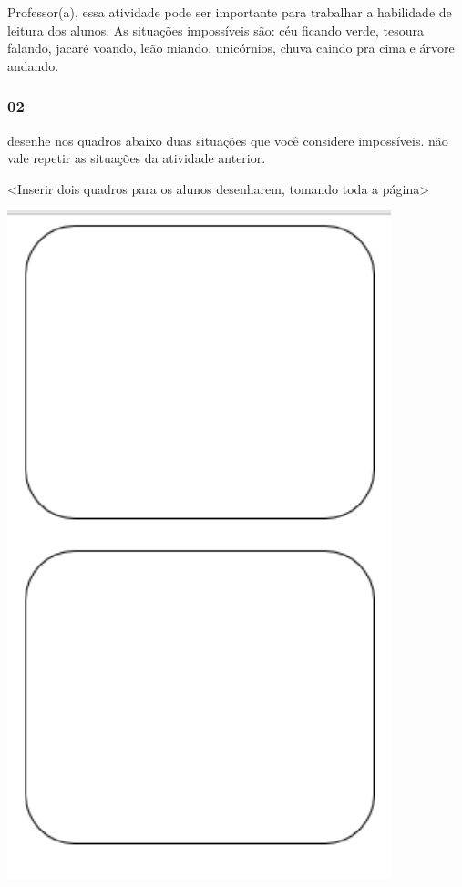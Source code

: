 Professor(a), essa atividade pode ser importante para trabalhar a
habilidade de leitura dos alunos. As situações impossíveis são: céu
ficando verde, tesoura falando, jacaré voando, leão miando, unicórnios,
chuva caindo pra cima e árvore andando.

\subsubsection{02}\label{section-64}

desenhe nos quadros abaixo duas situações que você considere
impossíveis. não vale repetir as situações da atividade anterior.

\textless{}Inserir dois quadros para os alunos desenharem, tomando toda
a página\textgreater{}

\includegraphics[width=4.38938in,height=7.65199in]{media/image81.png}

